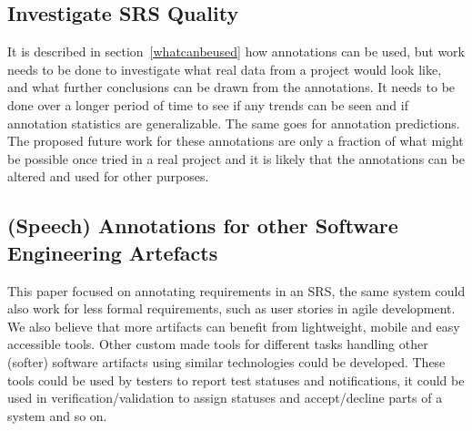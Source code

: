 \subsection{Investigate SRS Quality}
It is described in section~\ref{whatcanbeused} how annotations can be used, but work needs to be done to investigate what real data from a project would look like, and what further conclusions can be drawn from the annotations. It needs to be done over a longer period of time to see if any trends can be seen and if annotation statistics are generalizable. The same goes for annotation predictions. The proposed future work for these annotations are only a fraction of what might be possible once tried in a real project and it is likely that the annotations can be altered and used for other purposes.

\subsection{(Speech) Annotations for other Software Engineering Artefacts}
This paper focused on annotating requirements in an SRS, the same system could also work for less formal requirements, such as user stories in agile development. We also believe that more artifacts can benefit from lightweight, mobile and easy accessible tools. Other custom made tools for different tasks handling other (softer) software artifacts using similar technologies could be developed. These tools could be used by testers to report test statuses and notifications, it could be used in verification/validation to assign statuses and accept/decline parts of a system and so on. 


